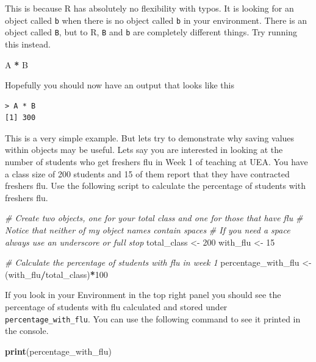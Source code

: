 \documentclass[
]{book}
\newenvironment{Shaded}{\begin{snugshade}}{\end{snugshade}}
\newcommand{\CommentTok}[1]{\textcolor[rgb]{0.56,0.35,0.01}{\textit{#1}}}
\newcommand{\DecValTok}[1]{\textcolor[rgb]{0.00,0.00,0.81}{#1}}
\newcommand{\FunctionTok}[1]{\textcolor[rgb]{0.13,0.29,0.53}{\textbf{#1}}}
\newcommand{\NormalTok}[1]{#1}
\newcommand{\OtherTok}[1]{\textcolor[rgb]{0.56,0.35,0.01}{#1}}
\newcommand{\SpecialCharTok}[1]{\textcolor[rgb]{0.81,0.36,0.00}{\textbf{#1}}}
\begin{document}
This is because R has absolutely no flexibility with typos. It is looking for an object called \texttt{b} when there is no object called \texttt{b} in your environment. There is an object called \texttt{B}, but to R, \texttt{B} and \texttt{b} are completely different things. Try running this instead.

\begin{Shaded}
\begin{Highlighting}[]
\NormalTok{A }\SpecialCharTok{*}\NormalTok{ B}
\end{Highlighting}
\end{Shaded}

Hopefully you should now have an output that looks like this

\begin{verbatim}
> A * B
[1] 300
\end{verbatim}

This is a very simple example. But lets try to demonstrate why saving values within objects may be useful. Lets say you are interested in looking at the number of students who get freshers flu in Week 1 of teaching at UEA. You have a class size of 200 students and 15 of them report that they have contracted freshers flu. Use the following script to calculate the percentage of students with freshers flu.

\begin{Shaded}
\begin{Highlighting}[]
\CommentTok{\# Create two objects, one for your total class and one for those that have flu}
\CommentTok{\# Notice that neither of my object names contain spaces}
\CommentTok{\# If you need a space always use an underscore or full stop}
\NormalTok{total\_class }\OtherTok{\textless{}{-}} \DecValTok{200}
\NormalTok{with\_flu }\OtherTok{\textless{}{-}} \DecValTok{15}

\CommentTok{\# Calculate the percentage of students with flu in week 1}
\NormalTok{percentage\_with\_flu }\OtherTok{\textless{}{-}}\NormalTok{ (with\_flu}\SpecialCharTok{/}\NormalTok{total\_class)}\SpecialCharTok{*}\DecValTok{100}
\end{Highlighting}
\end{Shaded}

If you look in your Environment in the top right panel you should see the percentage of students with flu calculated and stored under \texttt{percentage\_with\_flu}. You can use the following command to see it printed in the console.

\begin{Shaded}
\begin{Highlighting}[]
\FunctionTok{print}\NormalTok{(percentage\_with\_flu)}
\end{Highlighting}
\end{Shaded}
\end{document}
